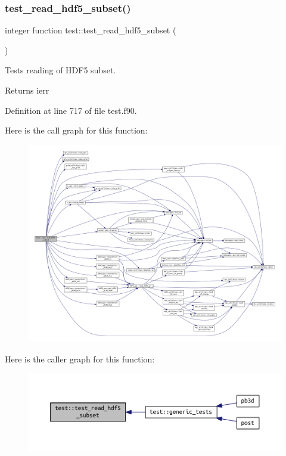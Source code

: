 \subsubsection{\texorpdfstring{test\+\_\+read\+\_\+hdf5\+\_\+subset()}{test\_read\_hdf5\_subset()}}
{\footnotesize\ttfamily integer function test\+::test\+\_\+read\+\_\+hdf5\+\_\+subset (\begin{DoxyParamCaption}{ }\end{DoxyParamCaption})}



Tests reading of H\+D\+F5 subset. 

\begin{DoxyReturn}{Returns}
ierr 
\end{DoxyReturn}


Definition at line 717 of file test.\+f90.

Here is the call graph for this function\+:\nopagebreak
\begin{figure}[H]
\begin{center}
\leavevmode
\includegraphics[width=350pt]{namespacetest_ac574f08ba400cd61070a6a6f13f6f7ee_cgraph}
\end{center}
\end{figure}
Here is the caller graph for this function\+:\nopagebreak
\begin{figure}[H]
\begin{center}
\leavevmode
\includegraphics[width=350pt]{namespacetest_ac574f08ba400cd61070a6a6f13f6f7ee_icgraph}
\end{center}
\end{figure}
\mbox{\label{namespacetest_a53c6b3d654d4577af301fe3b04473d6a}} 

